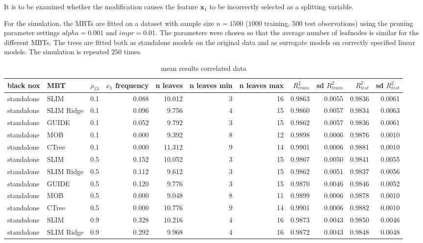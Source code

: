               
It is to be examined whether the modification causes the feature $\textbf{x}_1$ to be incorrectly selected as a splitting variable.


For the simulation, the MBTs are fitted on a dataset with sample size $ n = 1500$ ($1000$ training, $500$ test observations) using the pruning parameter settings $alpha = 0.001$ and $impr = 0.01$. The parameters were chosen so that the average number of leafnodes is similar for the different MBTs. The trees are fitted both as standalone models on the original data and as surrogate models on correctly specified linear models. The simulation is repeated $250$ times.


\begin{table}[!htb]
\caption{mean results correlated data}
\centering \tiny
\begin{tabular}[t]{l|l|r|r|r|r|r|r|r|r|r}
\hline
black nox & MBT & $\rho_{13}$ & $x_1$ frequency & n leaves & n leaves min & n leaves max & $R^2_{train}$  & sd $R^2_{train}$ & $R^2_{test}$ & sd $R^2_{test}$ \\
\hline
standalone & SLIM & 0.1 & 0.088 & 10.012 & 3 & 16 & 0.9863 & 0.0055 & 0.9836 & 0.0061\\
standalone & SLIM Ridge & 0.1 & 0.096 & 9.756 & 4 & 15 & 0.9860 & 0.0057 & 0.9834 & 0.0063\\
standalone & GUIDE & 0.1 & 0.052 & 9.792 & 3 & 15 & 0.9862 & 0.0057 & 0.9836 & 0.0061\\
standalone & MOB & 0.1 & 0.000 & 9.392 & 8 & 12 & 0.9898 & 0.0006 & 0.9876 & 0.0010\\
standalone & CTree & 0.1 & 0.000 & 11.312 & 9 & 14 & 0.9901 & 0.0006 & 0.9881 & 0.0010\\
\hline
standalone & SLIM & 0.5 & 0.152 & 10.052 & 3 & 15 & 0.9867 & 0.0050 & 0.9841 & 0.0055\\
standalone & SLIM Ridge & 0.5 & 0.112 & 9.612 & 3 & 15 & 0.9862 & 0.0051 & 0.9837 & 0.0056\\
standalone & GUIDE & 0.5 & 0.120 & 9.776 & 3 & 15 & 0.9870 & 0.0046 & 0.9846 & 0.0052\\
standalone & MOB & 0.5 & 0.000 & 9.048 & 8 & 11 & 0.9899 & 0.0006 & 0.9878 & 0.0010\\
standalone & CTree & 0.5 & 0.000 & 10.776 & 9 & 14 & 0.9901 & 0.0006 & 0.9882 & 0.0010\\
\hline
standalone & SLIM & 0.9 & 0.328 & 10.216 & 4 & 16 & 0.9873 & 0.0043 & 0.9850 & 0.0046\\
standalone & SLIM Ridge & 0.9 & 0.292 & 9.968 & 4 & 16 & 0.9872 & 0.0043 & 0.9848 & 0.0048\\

\end{tabular}
\end{table}
